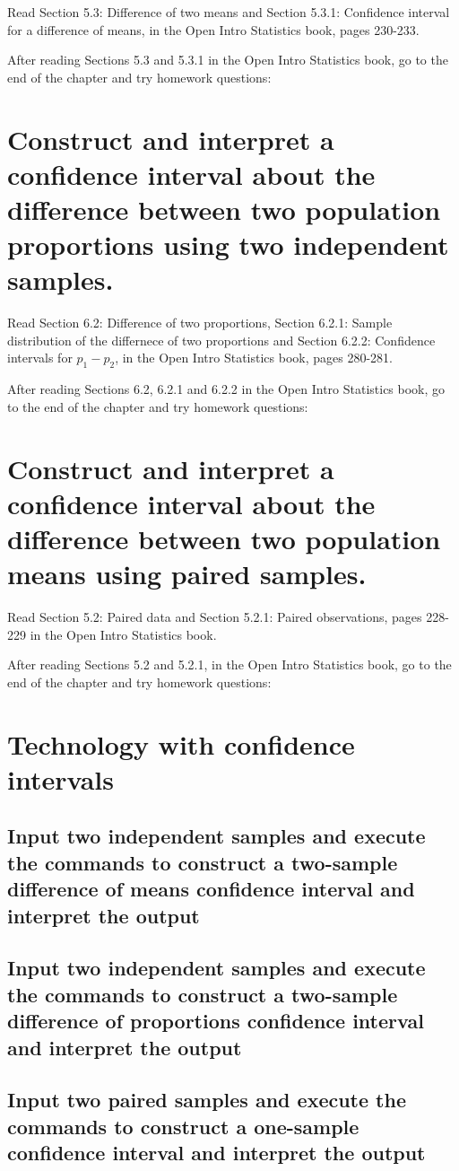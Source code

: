 Read Section 5.3: Difference of two means and Section 5.3.1: Confidence interval for a difference of means, in the Open Intro Statistics book, pages 230-233.  

After reading Sections 5.3 and 5.3.1 in the Open Intro Statistics book, go to the end of the chapter and try homework questions:

\section[CI for Difference of Proportions]{Construct and interpret a confidence interval about the difference between two population proportions using two independent samples.}

Read Section 6.2: Difference of two proportions, Section 6.2.1: Sample distribution of the differnece of two proportions and Section 6.2.2: Confidence intervals for \(p_{1}-p_{2}\), in the Open Intro Statistics book, pages 280-281.  

After reading Sections 6.2, 6.2.1 and 6.2.2 in the Open Intro Statistics book, go to the end of the chapter and try homework questions:

\section{Construct and interpret a confidence interval about the difference between two population means using paired samples.}

Read Section 5.2: Paired data and Section 5.2.1: Paired observations, pages 228-229 in the Open Intro Statistics book.

After reading Sections 5.2 and 5.2.1, in the Open Intro Statistics book, go to the end of the chapter and try homework questions:

\section{Technology with confidence intervals}

     \subsection{Input two independent samples and execute the commands to construct a two-sample difference of means confidence interval and interpret the output}

     \subsection{Input two independent samples and execute the commands to construct a two-sample difference of proportions confidence interval and interpret the output}

     \subsection{Input two paired samples and execute the commands to construct a one-sample confidence interval and interpret the output}
